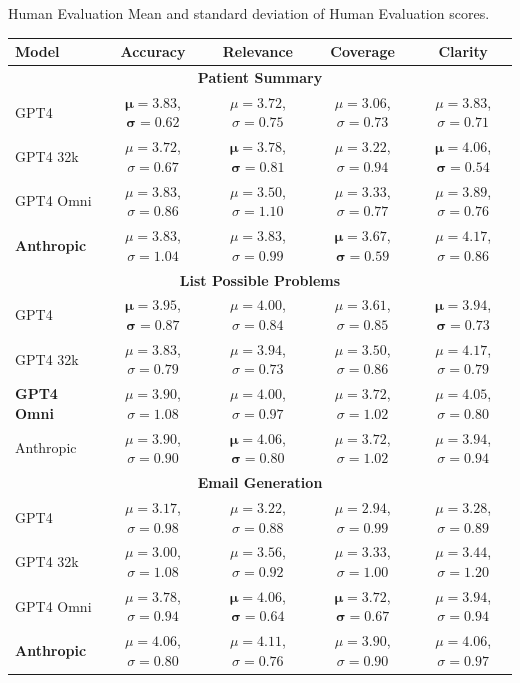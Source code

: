 \documentclass[usenames,dvipsnames]{beamer}
\begin{document}
\begin{frame}{Human Evaluation}
  Mean and standard deviation of Human Evaluation scores.\\
  {\tiny
  \centering
  \begin{table}[]
    \setlength{\extrarowheight}{2pt}
    \begin{tabular}{|l|c|c|c|c|}
    \hline
    Model & Accuracy & Relevance & Coverage & Clarity  \\
    \hline
    \multicolumn{5}{|c|}{\textbf{Patient Summary}} \\
    \hline
    GPT4     & $\mathbf{\mu=3.83}$, $\mathbf{\sigma=0.62}$ & $\mu=3.72$, $\sigma=0.75$ & $\mu=3.06$, $\sigma=0.73$ & $\mu=3.83$, $\sigma=0.71$ \\
    GPT4 32k  & $\mu=3.72$, $\sigma=0.67$ & $\mathbf{\mu=3.78}$, $\mathbf{\sigma=0.81}$ & $\mu=3.22$, $\sigma=0.94$ & $\mathbf{\mu=4.06}$, $\mathbf{\sigma=0.54}$ \\
    GPT4 Omni & $\mu=3.83$, $\sigma=0.86$ & $\mu=3.50$, $\sigma=1.10$ & $\mu=3.33$, $\sigma=0.77$ & $\mu=3.89$, $\sigma=0.76$ \\
    \textbf{Anthropic} & $\mu=3.83$, $\sigma=1.04$ & $\mu=3.83$, $\sigma=0.99$ & $\mathbf{\mu=3.67}$, $\mathbf{\sigma=0.59}$ & $\mu=4.17$, $\sigma=0.86$ \\
    \hline
    \multicolumn{5}{|c|}{\textbf{List Possible Problems}} \\
    \hline
    GPT4      & $\mathbf{\mu=3.95}$, $\mathbf{\sigma=0.87}$ & $\mu=4.00$, $\sigma=0.84$ & $\mu=3.61$, $\sigma=0.85$ & $\mathbf{\mu=3.94}$, $\mathbf{\sigma=0.73}$ \\
    GPT4 32k  & $\mu=3.83$, $\sigma=0.79$ & $\mu=3.94$, $\sigma=0.73$ & $\mu=3.50$, $\sigma=0.86$ & $\mu=4.17$, $\sigma=0.79$ \\
    \textbf{GPT4 Omni}     & $\mu=3.90$, $\sigma=1.08$ & $\mu=4.00$, $\sigma=0.97$ & $\mu=3.72$, $\sigma=1.02$ & $\mu=4.05$, $\sigma=0.80$ \\
    Anthropic & $\mu=3.90$, $\sigma=0.90$ & $\mathbf{\mu=4.06}$, $\mathbf{\sigma=0.80}$ & $\mu=3.72$, $\sigma=1.02$ & $\mu=3.94$, $\sigma=0.94$ \\
    \hline
    \multicolumn{5}{|c|}{\textbf{Email Generation}} \\
    \hline
    GPT4      & $\mu=3.17$, $\sigma=0.98$ & $\mu=3.22$, $\sigma=0.88$ & $\mu=2.94$, $\sigma=0.99$ & $\mu=3.28$, $\sigma=0.89$ \\
    GPT4 32k  & $\mu=3.00$, $\sigma=1.08$ & $\mu=3.56$, $\sigma=0.92$ & $\mu=3.33$, $\sigma=1.00$ & $\mu=3.44$, $\sigma=1.20$ \\
    GPT4 Omni     & $\mu=3.78$, $\sigma=0.94$ & $\mathbf{\mu=4.06}$, $\mathbf{\sigma=0.64}$ & $\mathbf{\mu=3.72}$, $\mathbf{\sigma=0.67}$ & $\mu=3.94$, $\sigma=0.94$ \\
    \textbf{Anthropic} & $\mu=4.06$, $\sigma=0.80$ & $\mu=4.11$, $\sigma=0.76$ & $\mu=3.90$, $\sigma=0.90$ & $\mu=4.06$, $\sigma=0.97$ \\
    \hline
  \end{tabular}
\end{table}
}
\end{frame}
\end{document}
